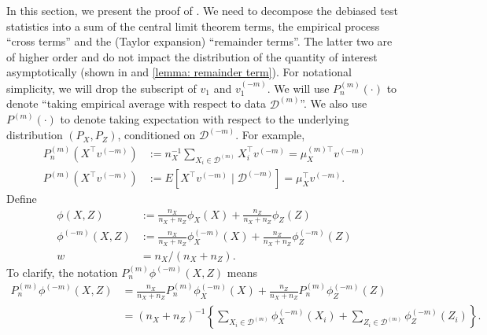 \documentclass[11pt]{article}
\begin{document}
In this section, we present the proof of . We need to decompose the debiased test statistics into a sum of the central limit theorem terms, the empirical process ``cross terms'' and the (Taylor expansion) ``remainder terms''. The latter two are of higher order and do not impact the distribution of the quantity of interest asymptotically (shown in  and \ref{lemma: remainder term}). For notational simplicity, we will drop the subscript of $v_1$ and $v_1^{(-m)}$. We will use $P_n^{(m)}(\cdot)$ to denote ``taking empirical average with respect to data $\mathcal{D}^{(m)}$''. We also use $P^{(m)}(\cdot)$ to denote taking expectation with respect to the underlying distribution $(P_X,P_Z)$, conditioned on $\mathcal{D}^{(-m)}$. For example,
\begin{align}
    P_n^{(m)} (X^\top v^{(-m)}) &:= n_X^{-1}\sum_{X_i\in\mathcal{D}^{(m)}} X_i^\top v^{(-m)} = \mu_X^{(m)\top}v^{(-m)}\nonumber\\
    P^{(m)}(X^\top v^{(-m)}) & := E[X^\top v^{(-m)}\mid \mathcal{D}^{(-m)}] = \mu_X^\top v^{(-m)}\nonumber.
\end{align}
Define
\begin{align*}
    \phi(X,Z) & := \frac{n_X}{n_X + n_Z} \phi_X(X) + \frac{n_Z}{n_X + n_Z} \phi_Z(Z)\\
    \phi^{(-m)}(X,Z) & := \frac{n_X}{n_X + n_Z} \phi_X^{(-m)}(X) + \frac{n_Z}{n_X + n_Z} \phi_Z^{(-m)}(Z)\\
    w &= n_X/(n_X + n_Z).
\end{align*}
To clarify, the notation $P_n^{(m)}\phi^{(-m)}(X,Z)$ means
\begin{align*}
    P_n^{(m)}\phi^{(-m)}(X,Z) 
    &= \frac{n_X}{n_X + n_Z} P_n^{(m)}\phi_X^{(-m)}(X) + \frac{n_Z}{n_X + n_Z} P_n^{(m)}\phi_Z^{(-m)}(Z)\\
    & = (n_X+n_Z)^{-1}\left\{\sum_{X_i \in \mathcal{D}^{(m)}} \phi_X^{(-m)}\left(X_i\right)+\sum_{Z_i \in \mathcal{D}^{(m)}} \phi_Z^{(-m)}\left(Z_i\right)\right\}.
\end{align*}
\end{document}

